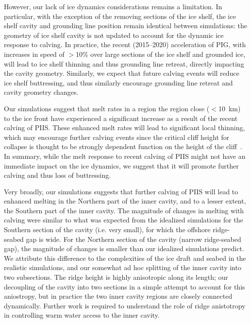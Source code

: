 \documentclass[draft]{agujournal2019}
\begin{document}
However, our lack of ice dynamics considerations remains a limitation. In particular, with the exception of the removing sections of the ice shelf, the ice shelf cavity and grounding line position remain identical between simulations: the geometry of ice shelf cavity is not updated to account for the dynamic ice response to calving. In practice, the recent (2015--2020) acceleration of PIG, with increases in speed of $>$10\% over large sections of the ice shelf and grounded ice, will lead to ice shelf thinning and thus grounding line retreat, directly impacting the cavity geometry. Similarly, we expect that future calving events will reduce ice shelf buttressing, and thus similarly encourage grounding line retreat and cavity geometry changes. 

Our simulations suggest that melt rates in a region the region close ($<$10~km) to the ice front have experienced a significant increase as a result of the recent calving of PIIS. These enhanced melt rates will lead to significant local thinning, which may encourage further calving events since the critical cliff height for collapse is thought to be strongly dependent function on the height of the cliff~\cite[ for example]{Crawford2021NatureComms}. In summary, while the melt response to recent calving of PIIS might not have an immediate impact on the ice dynamics, we suggest that it will promote further calving and thus loss of buttressing.

Very broadly, our simulations suggests that further calving of PIIS will lead to enhanced melting in the Northern part of the inner cavity, and to a lesser extent, the Southern part of the inner cavity. The magnitude of changes in melting with calving were similar to what was expected from the idealized simulations for the Southern section of the cavity (i.e. very small), for which the offshore ridge-seabed gap is wide. For the Northern section of the cavity (narrow ridge-seabed gap), the magnitude of changes is smaller than our idealized simulations predict. We attribute this difference to the complexities of the ice draft and seabed in the realistic simulations, and our somewhat ad hoc splitting of the inner cavity into two subsections. The ridge height is highly anisotropic along its length; our decoupling of the cavity into two sections in a simple attempt to account for this aniostropy, but in practice the two inner cavity regions are closely connected dynamically. Further work is required to understand the role of ridge anistotropy in controlling warm water access to the inner cavity.
\end{document}
